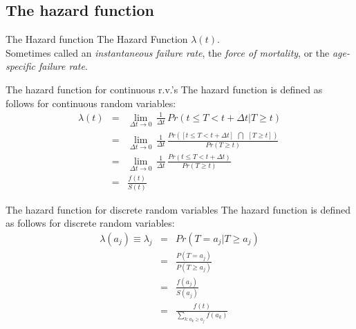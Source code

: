 \documentclass[envcountsect, 10pt, portrait, palatino]{beamer}
\begin{document}
\subsection{The hazard function}
\begin{frame}{The Hazard function}
The Hazard Function $\lambda(t)$.\\[2ex]
Sometimes called an {\em instantaneous failure
rate}, the {\em force of mortality}, or the
{\em age-specific failure rate}.
\end{frame}
\begin{frame}{The hazard function for continuous r.v.'s}
The hazard function is defined as follows for continuous random variables:
\begin{eqnarray*}
\lambda(t)  & = &
\lim_{\Delta t \rightarrow 0} \, \frac{1}{\Delta t}\,
Pr(t \le T <  t+\Delta t | T \ge t) \\[2ex]
& = & \lim_{\Delta t \rightarrow 0} \, \frac{1}{\Delta t} \,
\frac{Pr([t \le T <  t+\Delta t] ~~ \bigcap~~ [T \ge t])}
{Pr(T \ge t)}\\[2ex]
& = & \lim_{\Delta t \rightarrow 0} \, \frac{1}{\Delta t} \,
\frac{Pr(t \le T <  t+\Delta t)}{Pr(T \ge t)}\\[2ex]
& = & \frac{f(t)}{S(t)}
\end{eqnarray*}
\end{frame}
\begin{frame}{The hazard function for discrete  random variables}
The hazard function is defined as follows for discrete random variables:
   \begin{eqnarray*}
  \lambda(a_j)\equiv \lambda_j   & = &  Pr(T = a_j | T \ge a_j) \\[1ex]
  & = & \frac{P(T=a_j)}{P(T\ge a_j)}\\[1ex]
  & = & \frac{f(a_j)}{S(a_j)}\\[1ex]
  & = & \frac{f(t)}{\sum_{k:a_k\ge a_j}f(a_k)}\\[1ex]
  \end{eqnarray*}
\end{frame}
\end{document}
